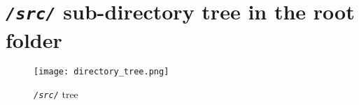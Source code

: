 \documentclass[10pt, a4paper]{article}
\newcommand{\textFunc}[1]{\texttt{\textit{#1}}}
\begin{document}

\section{\textFunc{/src/} sub-directory tree in the root folder}
\label{dirTree}
\begin{figure}[hbt!]
    \captionsetup{singlelinecheck = false, format= hang, justification=raggedright, font=footnotesize, labelsep=space}
    \begin{measuredfigure}
        \texttt{[image: directory\_tree.png]}
        \caption{\textFunc{/src/} tree}    
    \end{measuredfigure}
    \label{tree}
\end{figure}
\end{document}
